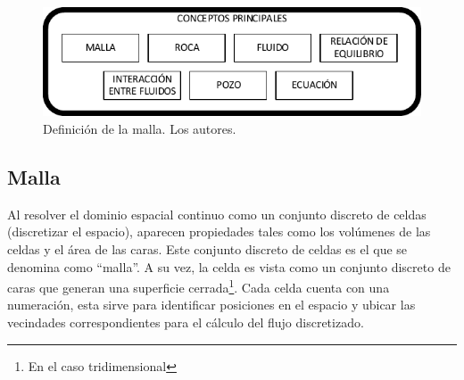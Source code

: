 \begin{figure}[h]
	\centering%
	\includegraphics[width=0.9\linewidth]{Fig/Conceptos.pdf}%
	\caption{Definición de la malla. Los autores.} \label{fig:Concepts}
\end{figure}

\subsection{Malla}
Al resolver el dominio espacial continuo como un conjunto discreto de celdas (discretizar el espacio), aparecen propiedades tales como los volúmenes de las celdas y el área de las caras. Este conjunto discreto de celdas es el que se denomina como ``malla''. A su vez, la celda es vista como un conjunto discreto de caras que generan una superficie cerrada\footnote{En el caso tridimensional}. Cada celda cuenta con una numeración, esta sirve para identificar posiciones en el espacio y ubicar las vecindades correspondientes para el cálculo del flujo discretizado.\\

